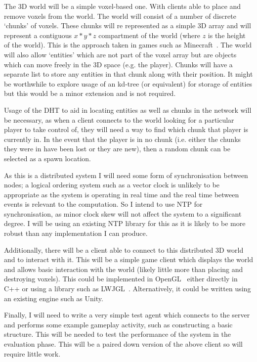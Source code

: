 \documentclass[11pt,a4paper]{article}
\begin{document}
	The 3D world will be a simple voxel-based one. With clients able to place and remove voxels from the world. The world will consist of a number of discrete `chunks' of voxels. These chunks will re represented as a simple 3D array and will represent a contiguous $x*y*z$ compartment of the world (where $z$ is the height of the world). This is the approach taken in games such as Minecraft~\cite{mc}. The world will also allow `entities' which are not part of the voxel array but are objects which can move freely in the 3D space (e.g. the player). Chunks will have a separate list to store any entities in that chunk along with their position. It might be worthwhile to explore usage of an kd-tree (or equivalent) for storage of entities but this would be a minor extension and is not required.
	
	Usage of the DHT to aid in locating entities as well as chunks in the network will be necessary, as when a client connects to the world looking for a particular player to take control of, they will need a way to find which chunk that player is currently in. In the event that the player is in no chunk (i.e. either the chunks they were in have been lost or they are new), then a random chunk can be selected as a spawn location.
	
	As this is a distributed system I will need some form of synchronisation between nodes; a logical ordering system such as a vector clock is unlikely to be appropriate as the system is operating in real time and the real time between events is relevant to the computation. So I intend to use NTP for synchronisation, as minor clock skew will not affect the system to a significant degree. I will be using an existing NTP library for this as it is likely to be more robust than any implementation I can produce.
	
	Additionally, there will be a client able to connect to this distributed 3D world and to interact with it. This will be a simple game client which displays the world and allows basic interaction with the world (likely little more than placing and destroying voxels). This could be implemented in OpenGL~\cite{opengl} either directly in C++ or using a library such as LWJGL~\cite{lwjgl}. Alternatively, it could be written using an existing engine such as Unity.
	
	Finally, I will need to write a very simple test agent which connects to the server and performs some example gameplay activity, such as constructing a basic structure. This will be needed to test the performance of the system in the evaluation phase. This will be a paired down version of the above client so will require little work.
	
\end{document}
